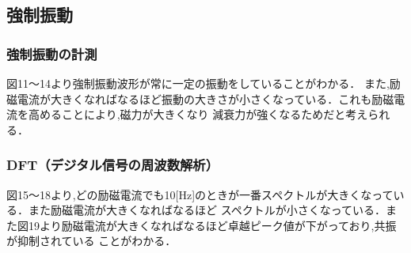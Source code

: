 \documentclass[a4paper,10.5pt]{jsarticle}
\begin{document}
\subsection{強制振動}
\subsubsection{強制振動の計測}
図11〜14より強制振動波形が常に一定の振動をしていることがわかる．
また,励磁電流が大きくなればなるほど振動の大きさが小さくなっている．これも励磁電流を高めることにより,磁力が大きくなり
減衰力が強くなるためだと考えられる．
\subsubsection{DFT（デジタル信号の周波数解析）}
図15〜18より,どの励磁電流でも10[Hz]のときが一番スペクトルが大きくなっている．また励磁電流が大きくなればなるほど
スペクトルが小さくなっている．また図19より励磁電流が大きくなればなるほど卓越ピーク値が下がっており,共振が抑制されている
ことがわかる．
\end{document}
